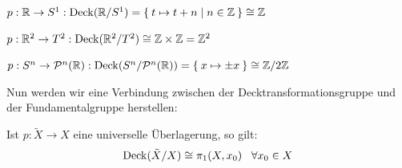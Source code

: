 \begin{beispiel}[Decktransformationen]
    \begin{bspenum}
        \item $p: \mathbb{R} \rightarrow S^1: \operatorname{Deck}(\mathbb{R} / S^1) = \Set{t \mapsto t + n | n \in \ensuremath{\mathbb{Z}}} \cong \mathbb{Z}$
        \item $p: \mathbb{R}^2 \rightarrow T^2: \operatorname{Deck}(\mathbb{R}^2 / T^2) \cong \mathbb{Z} \times \mathbb{Z} = \mathbb{Z}^2$
        \item $p: S^n \rightarrow \mathcal{P}^n(\mathbb{R}): \operatorname{Deck}(S^n / \mathcal{P}^n(\mathbb{R})) = \Set{x \mapsto \pm x} \cong \mathbb{Z} / 2 \mathbb{Z}$
    \end{bspenum}
\end{beispiel}

Nun werden wir eine Verbindung zwischen der Decktransformationsgruppe
und der Fundamentalgruppe herstellen:

\begin{satz}\label{thm:12.15}%
    Ist $p: \tilde{X} \rightarrow X$ eine universelle Überlagerung, 
    so gilt:
    \[\operatorname{Deck}(\tilde{X}/X) \cong \pi_1(X, x_0)\;\;\;\forall x_0 \in X\]
\end{satz}

